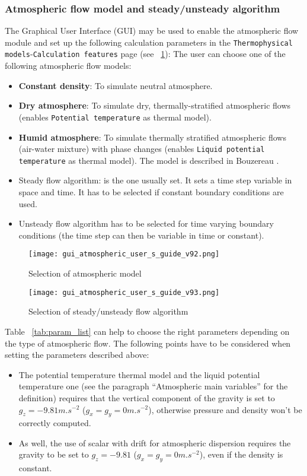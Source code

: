 \subsubsection{Atmospheric flow model and steady/unsteady algorithm}
%
The Graphical User Interface (GUI) may be used to enable the atmospheric flow
module and set up the following calculation parameters in the
\texttt{Thermophysical models}-\texttt{Calculation features} page
(see \figurename~\ref{fig:steady}):
%
%
The user can choose one of the following atmospheric flow models:
%
\begin{itemize}
\item \textbf{Constant density}: To simulate neutral atmosphere.
\item \textbf{Dry atmosphere}: To simulate dry, thermally-stratified
atmospheric flows (enables \texttt{Potential temperature} as thermal model).
\item \textbf{Humid atmosphere}: To simulate thermally stratified atmospheric
flows (air-water mixture) with phase changes (enables \texttt{Liquid potential
temperature} as thermal model). The model is described in
Bouzereau \cite{bouzereau}.
\end{itemize}
%
%
\begin{itemize}
\item Steady flow algorithm: is the one usually set. It sets a time step
variable in space and time. It has to be selected if constant boundary
conditions are used.
\item Unsteady flow algorithm has to be selected for time varying boundary
conditions (the time step can then be variable in time or constant).
\end{itemize}
%
\begin{figure}[ht]
\centerline{\texttt{[image: gui\_atmospheric\_user\_s\_guide\_v92.png]}}
\caption{Selection of atmospheric model}
\label{fig:steady}
\end{figure}
%
\begin{figure}[ht]
\centerline{\texttt{[image: gui\_atmospheric\_user\_s\_guide\_v93.png]}}
\caption{Selection of steady/unsteady flow algorithm}
\label{fig:global}
\end{figure}
%
Table \tablename~\ref{tab:param_list} can help to choose the right parameters
depending on the type of atmospheric flow.
%
The following points have to be considered when setting the parameters
described above:
\begin{itemize}
\item The potential temperature thermal model and the liquid potential
temperature one (see the paragraph ``Atmospheric main variables'' for the
definition) requires that the vertical component of the gravity is set to
$g_z=-9.81 m.s^{-2}$ ($g_x=g_y=0 m.s^{-2}$),
otherwise pressure and density won't be correctly computed.
\item As well, the use of scalar with drift for atmospheric dispersion requires
the gravity to be set to $g_z=-9.81$ ($g_x=g_y=0 m.s^{-2}$), even if the density
is constant.
\end{itemize}
%
